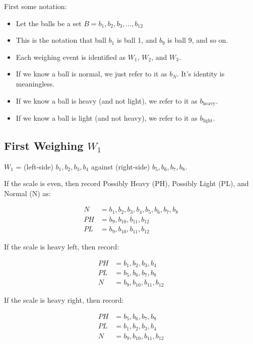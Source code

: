 \documentclass[12pt]{article}
\begin{document}
First some notation:\\[2mm]

\begin{itemize}
\item Let the balls be a set $B = { b_1, b_2, b_3, \ldots, b_{12}}$
\item This is the notation that ball $b_1$ is ball 1, and $b_{9}$ is ball 9, and so on.
\item Each weighing event is identified as $W_1$, $W_2$, and $W_3$.
\item If we know a ball is normal, we just refer to it as $b_N$. It's identity is meaningless.
\item If we know a ball is heavy (and not light), we refer to it as $b_{\textrm{heavy}}$.
\item If we know a ball is light (and not heavy), we refer to it as $b_{\textrm{light}}$.

\end{itemize}

\subsection*{First Weighing $W_1$}

$W_1$ = (left-side) ${ b_1, b_2, b_3, b_4}$ against (right-side) ${b_5, b_6, b_7, b_8}$.

If the scale is even, then record Possibly Heavy (PH), Possibly Light (PL), and Normal (N) as:

\begin{align*}
N &= {b_1, b_2, b_3, b_4, b_5, b_6, b_7, b_8}\\
PH  &= {b_9, b_{10}, b_{11}, b_{12}}\\
PL  &= {b_9, b_{10}, b_{11}, b_{12}}
\end{align*}

If the scale is heavy left,  then record:

\begin{align*}
PH &= {b_1, b_2, b_3, b_4}\\
PL &= {b_5, b_6, b_7, b_8}\\
N  &= {b_9, b_{10}, b_{11}, b_{12}}
\end{align*}

If the scale is heavy right, then record:

\begin{align*}
PH &= {b_5, b_6, b_7, b_8}\\
PL &= {b_1, b_2, b_3, b_4}\\
N  &= {b_9, b_{10}, b_{11}, b_{12}}
\end{align*}
\end{document}
